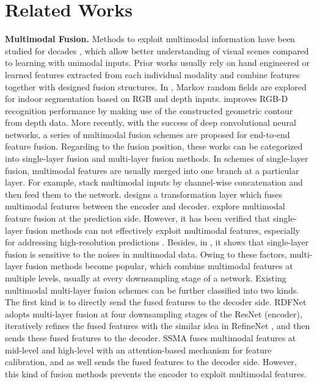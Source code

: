 \documentclass[sigconf]{acmart}
\begin{document}
\section{Related Works}
\label{related}
\textbf{Multimodal Fusion.}
Methods to exploit multimodal information have been studied for decades \cite{DBLP:conf/eccv/SilbermanHKF12,DBLP:conf/cvpr/GuptaAM13,DBLP:conf/eccv/GuptaGAM14,DBLP:conf/accv/HazirbasMDC16,DBLP:journals/tcyb/LinZJLH20}, which allow better understanding of visual scenes compared to learning with unimodal inputs. Prior works usually rely on hand engineered or learned features extracted from each individual modality and combine features together with designed fusion structures. In \cite{DBLP:conf/eccv/SilbermanHKF12}, Markov random fields are explored for indoor segmentation based on RGB and depth inputs. \cite{DBLP:conf/cvpr/GuptaAM13} improves RGB-D recognition performance by making use of the  constructed geometric contour from depth data. More recently, with the success of deep convolutional neural networks, a series of multimodal fusion schemes are proposed for end-to-end feature fusion. Regarding to the fusion position, these works can be categorized into single-layer fusion and multi-layer fusion methods. In schemes of single-layer fusion,  multimodal features are usually merged into one branch at a particular layer. For example, \cite{DBLP:journals/corr/abs-1301-3572,DBLP:conf/iccv/EigenF15} stack multimodal inputs by channel-wise concatenation and then feed them to the network. \cite{DBLP:conf/eccv/WangWTSW16} designs a transformation layer which fuses multimodal features between the encoder and decoder. \cite{DBLP:journals/corr/LongSD14,DBLP:conf/cvpr/ChengCLZH17} explore multimodal feature fusion at the prediction side. However, it has been verified that single-layer fusion methods  can not effectively exploit multimodal features, especially for addressing high-resolution predictions \cite{DBLP:conf/iccv/LeePH17,DBLP:journals/ijcv/RussakovskyDSKS15}. Besides, in \cite{DBLP:conf/cvpr/ZengTHYSCW19}, it shows that single-layer fusion is sensitive to the noises in multimodal data. Owing to these factors, multi-layer fusion methods become popular, which combine multimodal features at multiple levels, usually at every downsampling stage of a network. Existing multimodal multi-layer  fusion schemes can be further classified into two kinds. The first kind is to directly send the fused features to the decoder side. RDFNet \cite{DBLP:conf/iccv/LeePH17} adopts multi-layer fusion at four downsampling stages of the ResNet (encoder), iteratively refines the fused features with the similar idea in RefineNet \cite{DBLP:conf/cvpr/LinMSR17}, and then sends these fused features to the decoder. SSMA \cite{DBLP:journals/ijcv/RussakovskyDSKS15} fuses multimodal features at mid-level and high-level with an attention-based mechanism for feature calibration, and as well sends the fused features to the decoder side. However, this kind of fusion methods prevents the encoder to exploit multimodal features.
\end{document}
